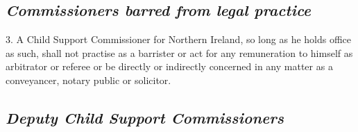 \documentclass[12pt,a4paper]{article}
\begin{document}
%
%
%
%
%

\subsection*{\itshape Commissioners barred from legal practice}


3.  A Child Support Commissioner for Northern Ireland, so long as he holds office as such, shall not practise as a barrister or act for any remuneration to himself as arbitrator or referee or be directly or indirectly concerned in any matter as a conveyancer, notary public or solicitor.


\subsection*{\itshape Deputy Child Support Commissioners}
\end{document}
